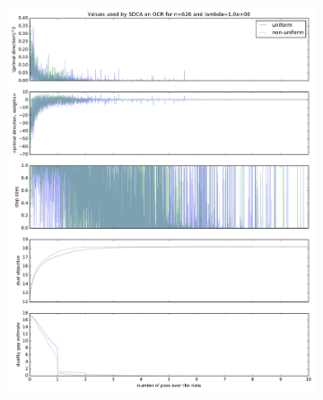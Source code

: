 \documentclass{article}
\DeclareMathOperator{\1}{\mathbb{1}}
\begin{document}
\begin{figure}[ht]
    \centering
    \begin{subfigure}[t]{0.3\textwidth}
        \centering
        \includegraphics[width=\textwidth]{images/20170914_040249_ocr_annex.pdf}
    \end{subfigure}
    ~
    \begin{subfigure}[t]{0.3\textwidth}
        \centering

\end{subfigure}
\end{figure}
\end{document}
